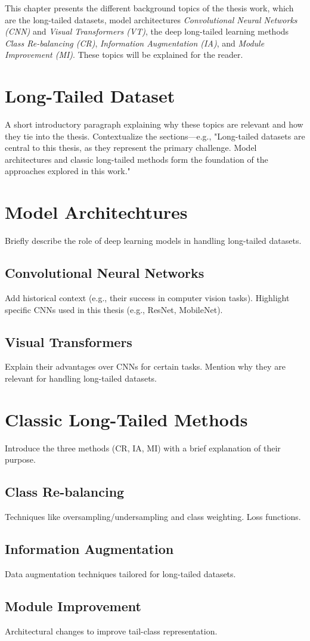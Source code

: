 
This chapter presents the different background topics of the thesis work, which are the long-tailed datasets, model architectures \textit{Convolutional Neural Networks (CNN)} and 
\textit{Visual Transformers (VT)}, the deep long-tailed learning methods \textit{Class Re-balancing (CR)}, \textit{Information Augmentation (IA)}, 
and \textit{Module Improvement (MI)}. These topics will be explained for the reader.

\section{Long-Tailed Dataset}
A short introductory paragraph explaining why these topics are relevant and how they tie into the thesis.
Contextualize the sections—e.g., "Long-tailed datasets are central to this thesis, as they represent the primary challenge. Model architectures and classic long-tailed methods form the foundation of the approaches explored in this work."

\section{Model Architechtures}
Briefly describe the role of deep learning models in handling long-tailed datasets.

\subsection{Convolutional Neural Networks}
Add historical context (e.g., their success in computer vision tasks).
Highlight specific CNNs used in this thesis (e.g., ResNet, MobileNet).

\subsection{Visual Transformers}
Explain their advantages over CNNs for certain tasks.
Mention why they are relevant for handling long-tailed datasets.


\section{Classic Long-Tailed Methods}
Introduce the three methods (CR, IA, MI) with a brief explanation of their purpose.

\subsection{Class Re-balancing}
Techniques like oversampling/undersampling and class weighting. Loss functions.

\subsection{Information Augmentation}
Data augmentation techniques tailored for long-tailed datasets.

\subsection{Module Improvement}
Architectural changes to improve tail-class representation.